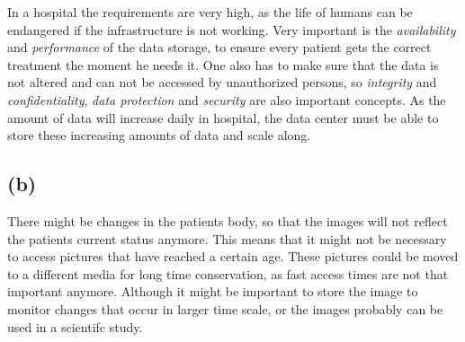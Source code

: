 \documentclass{article}
\begin{document}
	In a hospital the requirements are very high,
	as the life of humans can be endangered if the infrastructure is not working.
	Very important is the \emph{availability} and \emph{performance} of the data storage,
	to ensure every patient gets the correct treatment the moment he needs it.
	One also has to make sure that the data is not altered and can not be accessed by unauthorized persons,
	so \emph{integrity} and \emph{confidentiality}, \emph{data protection} and \emph{security} are also important concepts.
	As the amount of data will increase daily in hospital,
	the data center must be able to store these increasing amounts of data and scale along.

\subsection*{(b)}

	There might be changes in the patients body,
	so that the images will not reflect the patients current status anymore.
	This means that it might not be necessary to access pictures that have
	reached a certain age.
	These pictures could be moved to a different media for long time conservation,
	as fast access times are not that important anymore.
	Although it might be important to store the image to monitor changes that occur in larger time scale,
	or the images probably can be used in a scientifc study.
\end{document}
